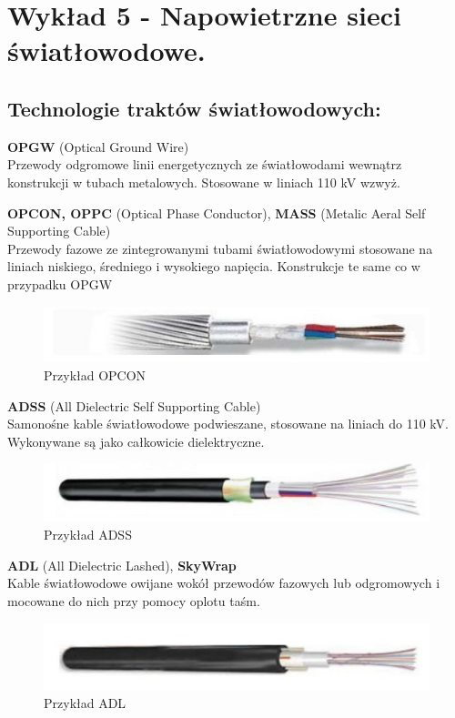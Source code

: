\documentclass{article}
\begin{document}
\section{Wykład 5 - Napowietrzne sieci światłowodowe.}
\subsection{Technologie traktów światłowodowych:}
\textbf{OPGW} (Optical Ground Wire)\\
Przewody odgromowe linii energetycznych ze światłowodami wewnątrz konstrukcji w tubach metalowych. Stosowane w liniach 110 kV wzwyż.

\textbf{OPCON, OPPC} (Optical Phase Conductor), \textbf{MASS} (Metalic Aeral Self Supporting Cable)\\
Przewody fazowe ze zintegrowanymi tubami światłowodowymi stosowane na liniach niskiego, średniego i wysokiego napięcia. Konstrukcje te same co w przypadku OPGW
\begin{figure}[H]
    \centering
    \includegraphics[width=0.6\linewidth]{w05z01.jpg}
    \caption{Przykład OPCON}
\end{figure}

\textbf{ADSS} (All Dielectric Self Supporting Cable)\\
Samonośne kable światłowodowe podwieszane, stosowane na liniach do 110 kV. Wykonywane są jako całkowicie dielektryczne.
\begin{figure}[H]
    \centering
    \includegraphics[width=0.6\linewidth]{w05z02.jpg}
    \caption{Przykład ADSS}
\end{figure}

\textbf{ADL} (All Dielectric Lashed), \textbf{SkyWrap}\\
Kable światłowodowe owijane wokół przewodów fazowych lub odgromowych i mocowane do nich przy pomocy oplotu taśm.
\begin{figure}[H]
    \centering
    \includegraphics[width=0.6\linewidth]{w05z03.jpg}
    \caption{Przykład ADL}
\end{figure}
\newpage
\end{document}
